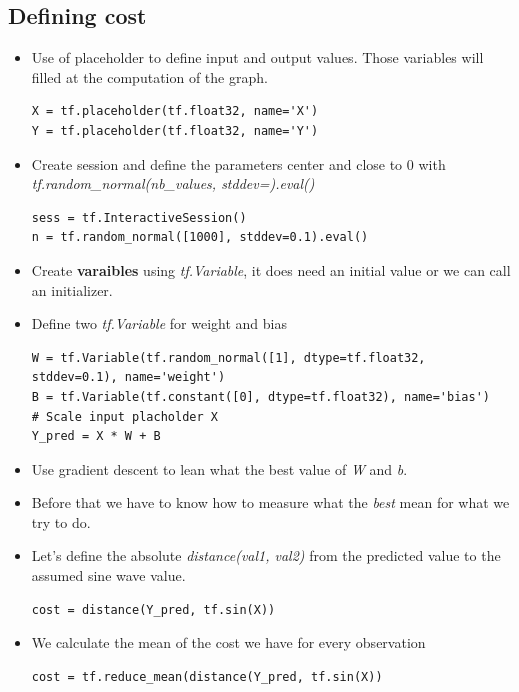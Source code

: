 \documentclass[12pt,a4paper]{article}
\begin{document}
\subsection{Defining cost}
\begin{itemize}
\item Use of placeholder to define input and output values. Those variables will filled at the computation of the graph.
\begin{lstlisting}
X = tf.placeholder(tf.float32, name='X')
Y = tf.placeholder(tf.float32, name='Y')
\end{lstlisting}
\item Create session and define the parameters center and close to 0 with \\
\textit{tf.random\_normal(nb\_values, stddev=).eval()}
\begin{lstlisting}
sess = tf.InteractiveSession()
n = tf.random_normal([1000], stddev=0.1).eval()
\end{lstlisting}
\item Create \textbf{varaibles} using \textit{tf.Variable}, it does need an initial value or we can call an initializer.
\item Define two \textit{tf.Variable} for weight and bias
\begin{lstlisting}
W = tf.Variable(tf.random_normal([1], dtype=tf.float32, stddev=0.1), name='weight')
B = tf.Variable(tf.constant([0], dtype=tf.float32), name='bias')
# Scale input placholder X
Y_pred = X * W + B
\end{lstlisting}
\item Use gradient descent to lean what the best value of \textit{W} and \textit{b}.
\item Before that we have to know how to measure what the \textit{best} mean for what we try to do.
\item Let's define the absolute \textit{distance(val1, val2)} from the predicted value to the assumed sine wave value.
\begin{lstlisting}
cost = distance(Y_pred, tf.sin(X))
\end{lstlisting}
\item We calculate the mean of the cost we have for every observation
\begin{lstlisting}
cost = tf.reduce_mean(distance(Y_pred, tf.sin(X))
\end{lstlisting}
\end{itemize}
\end{document}
